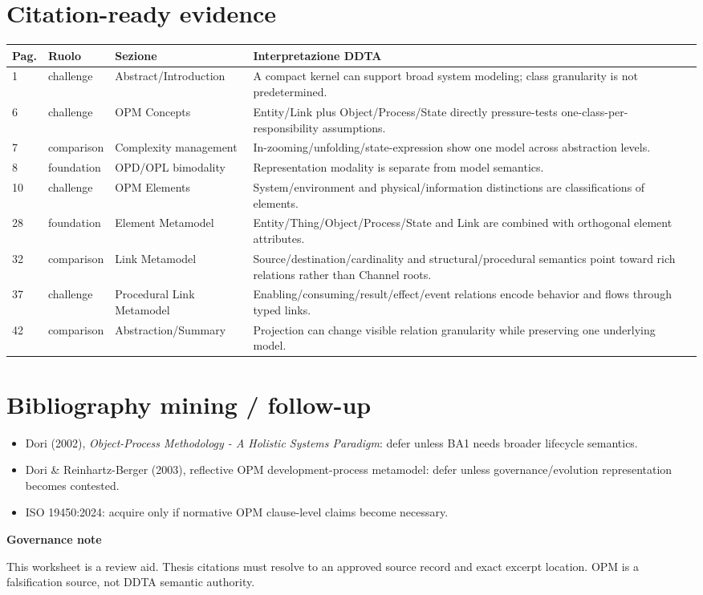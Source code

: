 \documentclass[10pt,a4paper]{article}
\newenvironment{challenge}[1]{\def\FrameCommand{\fcolorbox{ddtaorange}{ddtagray}}\MakeFramed{\advance\hsize-2\width\FrameRestore}\noindent\textbf{#1}\par\smallskip}{\endMakeFramed}
\begin{document}
\section{Citation-ready evidence}
\begin{longtable}{p{1.0cm}p{2.0cm}p{3.8cm}p{7.7cm}}
\toprule Pag. & Ruolo & Sezione & Interpretazione DDTA\\\midrule\endhead
1 & challenge & Abstract/Introduction & A compact kernel can support broad system modeling; class granularity is not predetermined.\\
6 & challenge & OPM Concepts & Entity/Link plus Object/Process/State directly pressure-tests one-class-per-responsibility assumptions.\\
7 & comparison & Complexity management & In-zooming/unfolding/state-expression show one model across abstraction levels.\\
8 & foundation & OPD/OPL bimodality & Representation modality is separate from model semantics.\\
10 & challenge & OPM Elements & System/environment and physical/information distinctions are classifications of elements.\\
28 & foundation & Element Metamodel & Entity/Thing/Object/Process/State and Link are combined with orthogonal element attributes.\\
32 & comparison & Link Metamodel & Source/destination/cardinality and structural/procedural semantics point toward rich relations rather than Channel roots.\\
37 & challenge & Procedural Link Metamodel & Enabling/consuming/result/effect/event relations encode behavior and flows through typed links.\\
42 & comparison & Abstraction/Summary & Projection can change visible relation granularity while preserving one underlying model.\\
\bottomrule
\end{longtable}

\section{Bibliography mining / follow-up}
\begin{itemize}
\item Dori (2002), \textit{Object-Process Methodology - A Holistic Systems Paradigm}: defer unless BA1 needs broader lifecycle semantics.
\item Dori \& Reinhartz-Berger (2003), reflective OPM development-process metamodel: defer unless governance/evolution representation becomes contested.
\item ISO 19450:2024: acquire only if normative OPM clause-level claims become necessary.
\end{itemize}
\begin{challenge}{Governance note}
This worksheet is a review aid. Thesis citations must resolve to an approved source record and exact excerpt location. OPM is a falsification source, not DDTA semantic authority.
\end{challenge}
\end{document}
